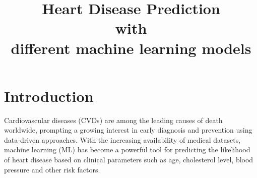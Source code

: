 \documentclass[conference]{IEEEtran}
\begin{document}
\title{Heart Disease Prediction \\with \\different machine learning models}

\author{
\and
{}
\and
{}
\and
{}
}

\maketitle






\section{Introduction}

Cardiovascular diseases (CVDs) are among the leading causes of death worldwide, prompting a growing interest in 
early diagnosis and prevention using data-driven approaches. With the increasing availability of medical datasets, 
machine learning (ML) has become a powerful tool for predicting the likelihood of heart disease based 
on clinical parameters such as age, cholesterol level, blood pressure and other risk factors.
\end{document}

